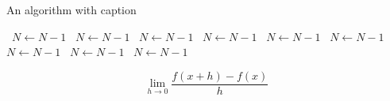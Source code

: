 \documentclass[a4paper]{article}
\begin{document}
\begin{algorithm}
\caption{An algorithm with caption}
\begin{algorithmic}
\    \State $N \gets N - 1$
\    \State $N \gets N - 1$
\    \State $N \gets N - 1$
\    \State $N \gets N - 1$
\    \State $N \gets N - 1$
\    \State $N \gets N - 1$
\    \State $N \gets N - 1$
\    \State $N \gets N - 1$
\    \State $N \gets N - 1$
\EndWhile
\end{algorithmic}
\end{algorithm}

\[\lim_{h \rightarrow 0 } \frac{f(x+h)-f(x)}{h}\]
\end{document}
